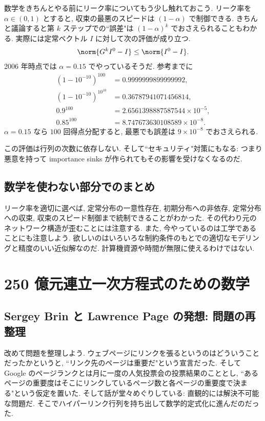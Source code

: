 \documentclass[openany, a4paper, oneside]{jsbook}
\begin{document}
数学をきちんとやる前にリーク率についてもう少し触れておこう.
リーク率を $\alpha \in (0, 1)$ とすると,
収束の最悪のスピードは $(1-\alpha)$ で制御できる.
きちんと議論すると第 $k$ ステップでの``誤差"は $(1-\alpha)^k$ でおさえられることもわかる.
実際には定常ベクトル $I$ に対して次の評価が成り立つ.
\begin{align}
 \norm{G^k I^0 - I}
 \leq
 \norm{I^0 - I}.
\end{align}
2006 年時点では $\alpha=0.15$ でやっているそうだ.
参考までに
\begin{align}
 (1-10^{-10})^{100}
 &=
 0.9999999899999992, \\
 (1-10^{-10})^{10^{10}}
 &=
 0.36787941071456814, \\
 0.9^{100}
 &=
 2.6561398887587544 \times 10^{-5}, \\
 0.85^{100}
 &=
 8.747673630108589 \times 10^{-8}.
\end{align}
$\alpha=0.15$ なら $100$ 回得点分配すると,
最悪でも誤差は $9 \times 10^{-8}$ でおさえられる.
\begin{rem}[ごまかしのご利益]
この評価は行列の次数に依存しない.
そして``セキュリティ"対策にもなる: つまり悪意を持って importance sinks が作られてもその影響を受けなくなるのだ.
\end{rem}
\subsection{数学を使わない部分でのまとめ}

リーク率を適切に選べば, 定常分布の一意性存在, 初期分布への非依存, 定常分布への収束,
収束のスピード制御まで統制できることがわかった.
その代わり元のネットワーク構造が歪むことには注意する.
また, 今やっているのは工学であることにも注意しよう.
欲しいのはいろいろな制約条件のもとでの適切なモデリングと精度のいい近似解なのだ.
計算機資源や時間が無限に使えるわけではない.
\section{250 億元連立一次方程式のための数学}

\subsection{Sergey Brin と Lawrence Page の発想: 問題の再整理}

改めて問題を整理しよう.
ウェブページにリンクを張るというのはどういうことだったかというと,
``リンク先のページは重要だ"という宣言だった.
そして Google のページランクとは月に一度の人気投票会の投票結果のこととし,
``あるページの重要度はそこにリンクしているページ数と各ページの重要度で決まる"という仮定を置いた.
そして話が堂々めぐりしている: 直観的には解決不可能な問題だ.
そこでハイパーリンク行列を持ち出して数学的定式化に進んだのだった.
\end{document}
